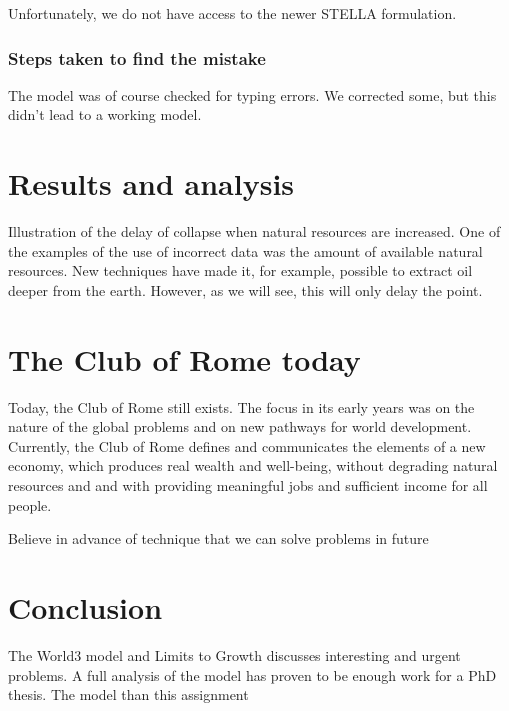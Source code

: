 \documentclass[10pt,a4paper]{scrartcl}
\begin{document}
Unfortunately, we do not have access to the newer STELLA formulation.

\subsubsection*{Steps taken to find the mistake}

The model was of course checked for typing errors. We corrected some, but this didn't lead to a working model.

\section*{Results and analysis}

Illustration of the delay of collapse when natural resources are increased. One of the examples of the use of incorrect data was the amount of available natural resources. New techniques have made it, for example, possible to extract oil deeper from the earth. However, as we will see, this will only delay the point.

\section*{The Club of Rome today}

Today, the Club of Rome still exists. The focus in its early years was on the nature of the global problems and on new pathways for world development. Currently, the Club of Rome defines and communicates the elements of a new economy, which produces real wealth and well-being, without degrading natural resources and and with providing meaningful jobs and sufficient income for all people.

Believe in advance of technique that we can solve problems in future

\section*{Conclusion}

The World3 model and Limits to Growth discusses interesting and urgent problems. A full analysis of the model has proven to be enough work for a PhD thesis. The model than this assignment 


\nocite{*}

\end{document}

